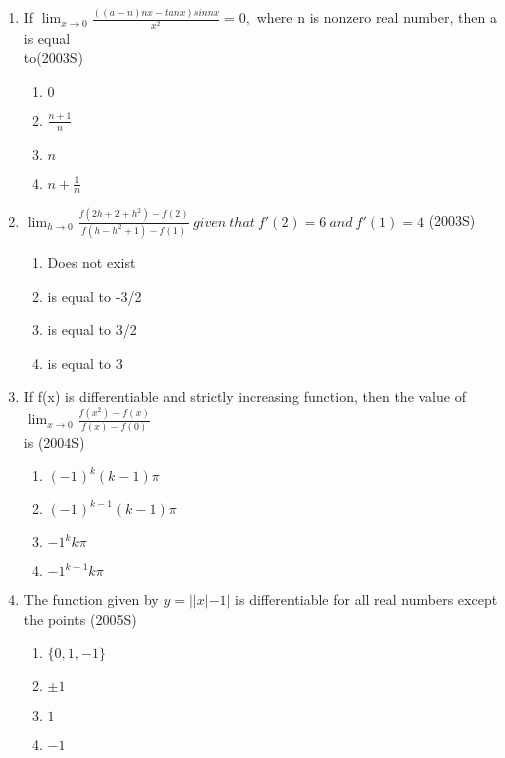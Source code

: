 \documentclass[journal,12pt,twocolumn]{IEEEtran}
\theoremstyle{remark}
\begin{document}
\begin{enumerate}
\item %

    If $\lim_{x \to 0} \frac{((a-n)nx-tanx)sinnx}{x^2} =0,$ where n is nonzero real number, then a is equal\\ to\hfill{(2003S)}
    \begin{enumerate}
     \item $0$
     \item $\frac{n+1}{n}$
     \item $n$
     \item $n+\frac{1}{n}$\\
    \end{enumerate}


\item %

    $\lim_{h \to 0} \frac{f(2h+2+h^2)-f(2)}{f(h-h^2+1)-f(1)}\ given\ that\ f'(2)=6\ and\ f'(1)=4$ \hfill{(2003S)}
    \begin{enumerate}
     \item Does not exist
     \item is equal to -3/2
     \item is equal to 3/2
     \item is equal to 3\\
    \end{enumerate}


\item %

If f(x) is differentiable and strictly increasing function, then the value of $\lim_{x \to 0} \frac{f(x^2)-f(x)}{f(x)-f(0)}$\\ is \hfill{(2004S)}
    \begin{enumerate}
     \item $(-1)^k (k-1) \pi$
     \item $(-1)^{k-1} (k-1) \pi$
     \item $-1^k k\pi$
     \item $-1^{k-1} k\pi$\\
    \end{enumerate}


\item %

The function given by $y=||x|-1|$ is differentiable for all real numbers except the points \hfill{(2005S)}
    \begin{enumerate}
     \item $\{0,1,-1\}$
     \item $\pm 1$
     \item $1$
     \item $-1$\\
    \end{enumerate}


\end{enumerate}
\end{document}
